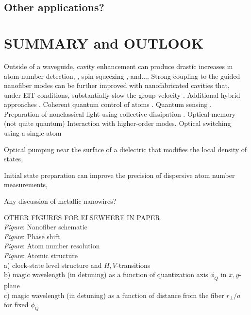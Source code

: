 \documentclass[preprint,aps,pra,onecolumn]{revtex4-1} %
\newcommand{\comment}[1]{{\color{Maroon} #1}}
\begin{document}


\subsection{Other applications?} 


\section{SUMMARY and OUTLOOK}

Outside of a waveguide, cavity enhancement can produce drastic increases in atom-number detection, \cite{zhang_collective_2012}, spin squeezing \cite{bohnet_reduced_2014}, and....   Strong coupling to the guided nanofiber modes can be further improved with nanofabricated cavities that, under EIT conditions, substantially slow the group velocity \cite{le_kien_intracavity_2009,wuttke_nanofiber_2012,nayak_optical_2014}.  Additional hybrid approaches \cite{hafezi_atomic_2012, yalla_cavity_2014}.  Coherent quantum control of atoms \cite{smith_quantum_2013-1}.  Quantum sensing \cite{kumar_autler-townes_2015}.  Preparation of nonclassical light using collective dissipation \cite{gonzalez-tudela_deterministic_2015}.  Optical memory (not quite quantum) \cite{sayrin_storage_2015, gouraud_demonstration_2015} Interaction with higher-order modes.  Optical switching using a single atom \cite{oshea_fiber-optical_2013} 

Optical pumping near the surface of a dielectric that modifies the local density of states, 

Initial state preparation can improve the precision of dispersive atom number measurements, 

\cite{scheel_directional_2015}
\comment{Any discussion of metallic nanowires?}

\comment{
OTHER FIGURES FOR ELSEWHERE IN PAPER \\
\emph{Figure}: Nanofiber schematic \\
\emph{Figure}: Phase shift \\
\emph{Figure}: Atom number resolution \\
\emph{Figure}: Atomic structure \\
a) clock-state level structure and $H,V$-transitions \\
b) magic wavelength (in detuning) as a function of quantization axis $\phi_Q$ in $x,y$-plane \\
c) magic wavelength (in detuning) as a function of distance from the fiber $r_\perp/a$ for fixed $\phi_Q$ 

}
\end{document}
